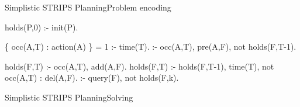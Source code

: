 \begin{frame}{Simplistic STRIPS Planning}{Problem encoding}
\begin{semiverbatim}
holds(P,0) :- init(P).

\{ occ(A,T) : action(A) \} = 1 :- time(T).
:- occ(A,T), pre(A,F), not holds(F,T-1).

holds(F,T) :- occ(A,T), add(A,F).
holds(F,T) :- holds(F,T-1), time(T), not occ(A,T) : del(A,F).
\pause
:- query(F), not holds(F,k).
\end{semiverbatim}
\end{frame}
\begin{frame}{Simplistic STRIPS Planning}{Solving}
\end{frame}
%
